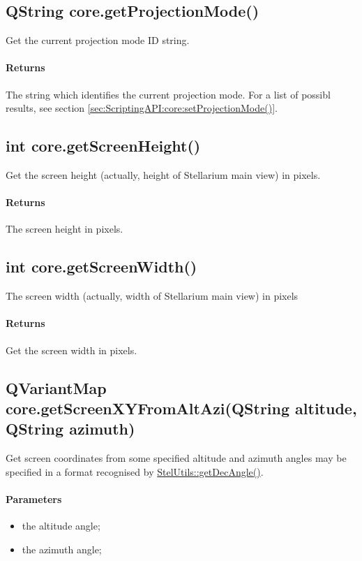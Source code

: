 \subsection{QString core.getProjectionMode()}
\label{sec:ScriptingAPI:core:getProjectionMode}
Get the current projection mode ID string.

\paragraph{Returns}
The string which identifies the current projection mode. For a list of possibl results, see section \ref{sec:ScriptingAPI:core:setProjectionMode()}.

\subsection{int core.getScreenHeight()}
\label{sec:ScriptingAPI:core:getScreenHeight}
Get the screen height (actually, height of Stellarium main view) in pixels.

\paragraph{Returns}
The screen height in pixels.

\subsection{int core.getScreenWidth()}
\label{sec:ScriptingAPI:core:getScreenWidth}
The screen width (actually, width of Stellarium main view) in pixels

\paragraph{Returns}
Get the screen width in pixels.

\subsection{QVariantMap core.getScreenXYFromAltAzi(QString altitude, QString azimuth)}
\label{sec:ScriptingAPI:core:getScreenXYFromAltAzi}
Get screen coordinates from some specified altitude and azimuth angles may be specified in a format recognised by \href{http://www.stellarium.org/doc/head/namespaceStelUtils.html#acd88f8194549c7d46656952428720427}{StelUtils::getDecAngle()}.

\paragraph{Parameters}
\begin{itemize}
\item {} the altitude angle;
\item {} the azimuth angle;
\end{itemize}

